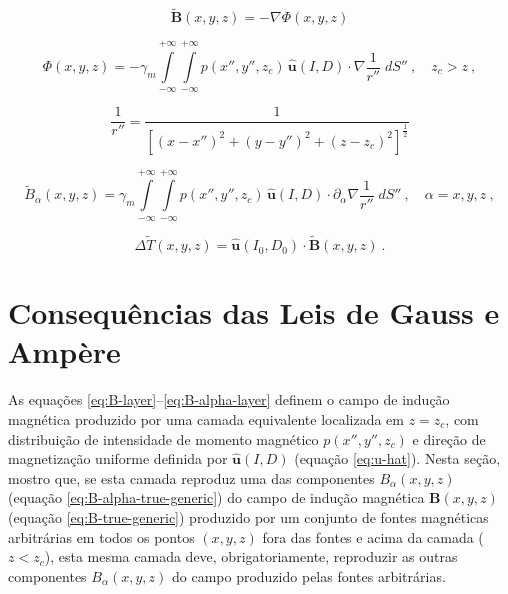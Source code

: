\begin{equation}
\tilde{\mathbf{B}}(x, y, z) = - \nabla \Phi(x, y, z)
\label{eq:B-layer}
\end{equation}

\begin{equation}
\Phi(x, y, z) = - \gamma_{m} \int\limits_{-\infty}^{+\infty}\int\limits_{-\infty}^{+\infty} 
p(x'', y'', z_{c}) \, \hat{\mathbf{u}}(I, D) \cdot \nabla \frac{1}{r''} \; dS'' \: , \quad z_{c} > z \: ,
\label{eq:Phi-potential}
\end{equation}

\begin{equation}
\frac{1}{r''} = \frac{1}{\left[ (x - x'')^{2} + (y - y'')^{2} + (z - z_{c})^{2} \right]^{\frac{1}{2}}}
\label{eq:inv-r''}
\end{equation}

\begin{equation}
\tilde{B}_{\alpha}(x, y, z) = \gamma_{m} \int\limits_{-\infty}^{+\infty}\int\limits_{-\infty}^{+\infty} 
p(x'', y'', z_{c}) \, \hat{\mathbf{u}}(I, D) \cdot \partial_{\alpha} \nabla \frac{1}{r''} \; dS'' 
\: , \quad \alpha = x, y, z \: ,
\label{eq:B-alpha-layer}
\end{equation}

\begin{equation}
\Delta\tilde{T}(x, y, z) = \hat{\mathbf{u}}(I_{0}, D_{0}) \cdot \tilde{\mathbf{B}}(x, y, z) \: .
\label{eq:Delta-T-layer}
\end{equation}


\section{Consequências das Leis de Gauss e Amp{\`e}re}
\label{sec:Gauss-Ampere}

As equações \ref{eq:B-layer}--\ref{eq:B-alpha-layer} definem o campo de indução 
magnética produzido por uma camada equivalente localizada em $z = z_{c}$,
com distribuição de intensidade de momento magnético 
$p(x'', y'', z_{c})$ e direção de magnetização uniforme definida por 
$\hat{\mathbf{u}}(I, D)$ (equação \ref{eq:u-hat}). Nesta seção, mostro que, 
se esta camada reproduz uma das componentes $B_{\alpha}(x, y, z)$ (equação \ref{eq:B-alpha-true-generic})
do campo de indução magnética $\mathbf{B}(x, y, z)$ (equação \ref{eq:B-true-generic}) 
produzido por um conjunto de fontes magnéticas arbitrárias em todos os pontos 
$(x, y, z)$ fora das fontes e acima da camada ($z < z_{c}$), esta mesma camada deve, 
obrigatoriamente, reproduzir as outras componentes $B_{\alpha}(x, y, z)$ do campo 
produzido pelas fontes arbitrárias.

